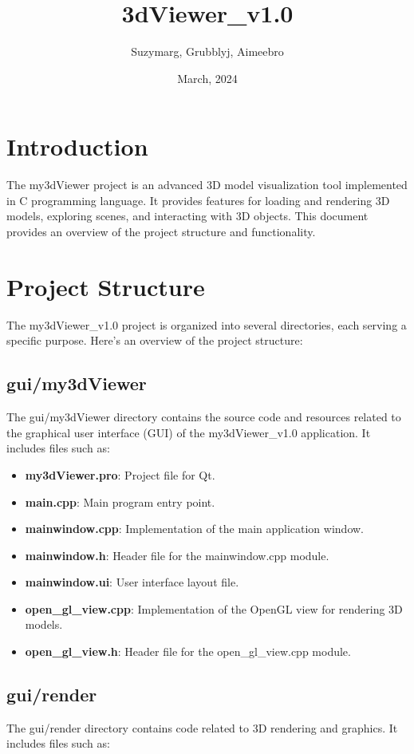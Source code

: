 \documentclass{article}
\title{3dViewer\_v1.0}
\author{Suzymarg, Grubblyj, Aimeebro}
\date{March, 2024}
\begin{document}
\maketitle

\newpage

\section{Introduction}
The my3dViewer project is an advanced 3D model visualization tool implemented in C programming language. It provides features for loading and rendering 3D models, exploring scenes, and interacting with 3D objects. This document provides an overview of the project structure and functionality.

\section{Project Structure}
The my3dViewer\_v1.0 project is organized into several directories, each serving a specific purpose. Here's an overview of the project structure:

\subsection{gui/my3dViewer}
The gui/my3dViewer directory contains the source code and resources related to the graphical user interface (GUI) of the my3dViewer\_v1.0 application. It includes files such as:

\begin{itemize}
\item \textbf{my3dViewer.pro}: Project file for Qt.
\item \textbf{main.cpp}: Main program entry point.
\item \textbf{mainwindow.cpp}: Implementation of the main application window.
\item \textbf{mainwindow.h}: Header file for the mainwindow.cpp module.
\item \textbf{mainwindow.ui}: User interface layout file.
\item \textbf{open\_gl\_view.cpp}: Implementation of the OpenGL view for rendering 3D models.
\item \textbf{open\_gl\_view.h}: Header file for the open\_gl\_view.cpp module.
\end{itemize}

\subsection{gui/render}
The gui/render directory contains code related to 3D rendering and graphics. It includes files such as:
\end{document}
